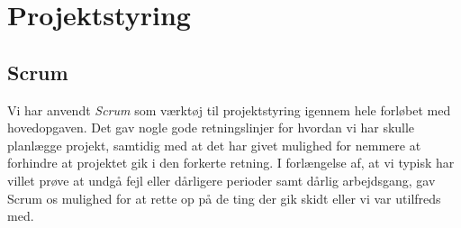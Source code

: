 \section{Projektstyring}
\subsection{Scrum}
Vi har anvendt \textit{Scrum} som værktøj til projektstyring igennem hele forløbet med hovedopgaven.
Det gav nogle gode retningslinjer for hvordan vi har skulle planlægge projekt, samtidig med at det har givet mulighed for nemmere at forhindre at projektet gik i den forkerte retning.
I forlængelse af, at vi typisk har villet prøve at undgå fejl eller dårligere perioder samt dårlig arbejdsgang, gav Scrum os mulighed for
at rette op på de ting der gik skidt eller vi var utilfreds med.


